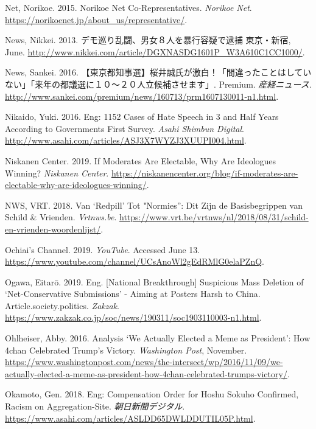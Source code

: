 \documentclass[10pt,british,A4paper,,openany]{memoir}
\begin{document}
\hypertarget{ref-net_norikoe_2015}{}
Net, Norikoe. 2015. Norikoe Net Co-Representatives. \emph{Norikoe Net}.
\url{https://norikoenet.jp/about_us/representative/}.

\hypertarget{ref-nikkei_news__2013}{}
News, Nikkei. 2013. デモ巡り乱闘、男女８人を暴行容疑で逮捕 東京・新宿,
June. \url{http://www.nikkei.com/article/DGXNASDG1601P_W3A610C1CC1000/}.

\hypertarget{ref-sankei_news__2016}{}
News, Sankei. 2016.
【東京都知事選】桜井誠氏が激白！「間違ったことはしていない」「来年の都議選に１０～２０人立候補させます」.
Premium. \emph{産経ニュース}.
\url{http://www.sankei.com/premium/news/160713/prm1607130011-n1.html}.

\hypertarget{ref-nikaido_eng:_2016}{}
Nikaido, Yuki. 2016. Eng: 1152 Cases of Hate Speech in 3 and Half Years
According to Governments First Survey. \emph{Asahi Shimbun Digital}.
\url{http://www.asahi.com/articles/ASJ3X7WYZJ3XUUPI004.html}.

\hypertarget{ref-niskanen_center_if_2019}{}
Niskanen Center. 2019. If Moderates Are Electable, Why Are Ideologues
Winning? \emph{Niskanen Center}.
\url{https://niskanencenter.org/blog/if-moderates-are-electable-why-are-ideologues-winning/}.

\hypertarget{ref-nws_van_2018}{}
NWS, VRT. 2018. Van `Redpill' Tot "Normies'': Dit Zijn de Basisbegrippen
van Schild \& Vrienden. \emph{Vrtnws.be}.
\url{https://www.vrt.be/vrtnws/nl/2018/08/31/schild-en-vrienden-woordenlijst/}.

\hypertarget{ref-noauthor_ochiais_nodate}{}
Ochiai's Channel. 2019. \emph{YouTube}. Accessed June 13.
\url{https://www.youtube.com/channel/UCsAnoWl2gEdRMlG0elaPZnQ}.

\hypertarget{ref-ogawa_eng._2019}{}
Ogawa, Eitarō. 2019. Eng. {[}National Breakthrough{]} Suspicious Mass
Deletion of `Net-Conservative Submissions' - Aiming at Posters Harsh to
China. Article.society.politics. \emph{Zakzak}.
\url{https://www.zakzak.co.jp/soc/news/190311/soc1903110003-n1.html}.

\hypertarget{ref-ohlheiser_analysis_2016}{}
Ohlheiser, Abby. 2016. Analysis `We Actually Elected a Meme as
President': How 4chan Celebrated Trump's Victory. \emph{Washington
Post}, November.
\url{https://www.washingtonpost.com/news/the-intersect/wp/2016/11/09/we-actually-elected-a-meme-as-president-how-4chan-celebrated-trumps-victory/}.

\hypertarget{ref-okamoto_eng:_2018}{}
Okamoto, Gen. 2018. Eng: Compensation Order for Hoshu Sokuho Confirmed,
Racism on Aggregation-Site. \emph{朝日新聞デジタル}.
\url{https://www.asahi.com/articles/ASLDD65DWLDDUTIL05P.html}.
\end{document}
